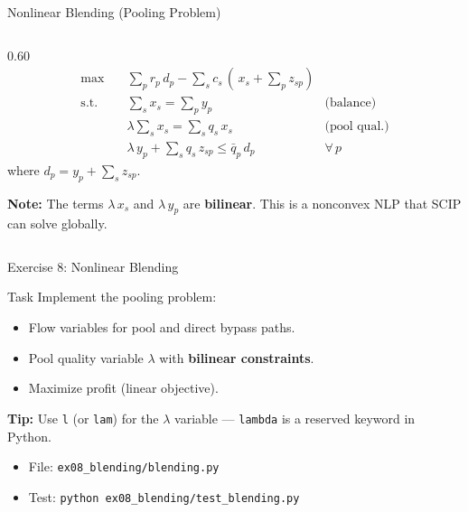 \documentclass[aspectratio=169,10pt]{beamer}
\begin{document}
\begin{frame}{Nonlinear Blending (Pooling Problem)}
\begin{columns}[T]
\begin{column}{0.60\textwidth}
\begin{align*}
  \max \quad & \textstyle\sum_p r_p\,d_p - \sum_s c_s\,(\,x_s + \sum_p z_{sp})\\[3pt]
  \text{s.t.} \quad
    & \textstyle\sum_s x_s = \sum_p y_p
      & \text{(balance)} \\
    & \lambda \textstyle\sum_s x_s = \sum_s q_s\, x_s
      & \text{(pool qual.)} \\
    & \lambda\, y_p + \textstyle\sum_s q_s\, z_{sp} \le \bar{q}_p\, d_p
      & \forall\, p
\end{align*}
where $d_p = y_p + \sum_s z_{sp}$.

\smallskip
{\small\textbf{Note:} The terms $\lambda\, x_s$ and $\lambda\, y_p$ are
\textbf{bilinear}. This is a nonconvex NLP that SCIP can solve globally.}
\end{column}
\end{columns}
\end{frame}

\begin{frame}{Exercise 8: Nonlinear Blending}
\begin{block}{Task}
Implement the pooling problem:
\begin{itemize}
  \item Flow variables for pool and direct bypass paths.
  \item Pool quality variable $\lambda$ with \textbf{bilinear constraints}.
  \item Maximize profit (linear objective).
\end{itemize}
\textbf{Tip:} Use \texttt{l} (or \texttt{lam}) for the $\lambda$ variable —
\texttt{lambda} is a reserved keyword in Python.
\end{block}
\begin{itemize}
  \item File: \texttt{ex08\_blending/blending.py}
  \item Test: \texttt{python ex08\_blending/test\_blending.py}
\end{itemize}
\end{frame}
\end{document}
